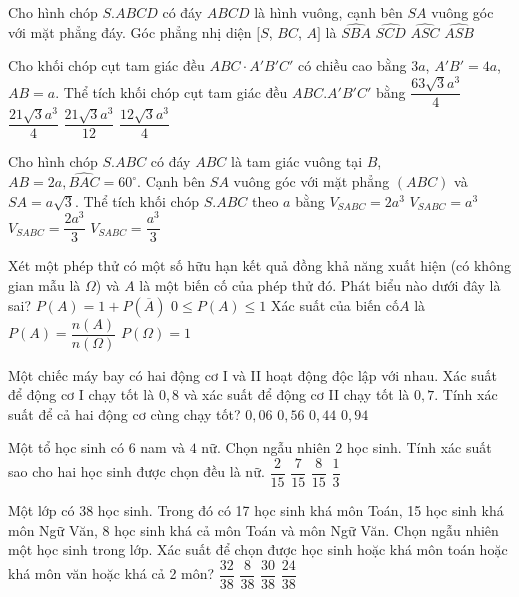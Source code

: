 \begin{ex}
Cho hình chóp $S.ABCD$ có đáy $ABCD$ là hình vuông, cạnh bên $SA$ vuông góc với mặt phẳng đáy. Góc phẳng nhị diện $[S$, $BC$, $A]$ là
\choice
{$\widehat{S B A}$}
{$\widehat{SCD}$}
{$\widehat{A S C}$}
{$\widehat{A S B}$}
\end{ex}
\begin{ex}
Cho khối chóp cụt tam giác đều $ABC \cdot A'B'C'$ có chiều cao bằng $3a$, $A'B'=4a$, $AB=a$. Thể tích khối chóp cụt tam giác đều $ABC.A'B'C'$ bằng
\choice
{$\dfrac{63\sqrt{3}a^3}{4}$}
{$\dfrac{21\sqrt{3}a^3}{4}$}
{$\dfrac{21\sqrt{3}a^3}{12}$}
{$\dfrac{12\sqrt{3}a^3}{4}$}
\end{ex}
\begin{ex}
Cho hình chóp $S.ABC$ có đáy $ABC$ là tam giác vuông tại $B$, $AB=2a,\widehat{BAC}=60^\circ $. Cạnh bên $SA$ vuông góc với mặt phẳng $(ABC)$ và $SA=a\sqrt{3}$. Thể tích khối chóp $S.ABC$ theo $a$ bằng
\choice
{${{V}_{SABC}}=2a^3$}
{${{V}_{SABC}}=a^3$}
{${{V}_{SABC}}=\dfrac{2a^3}{3}$}
{${{V}_{SABC}}=\dfrac{a^3}{3}$}
\end{ex}
\begin{ex}
Xét một phép thử có một số hữu hạn kết quả đồng khả năng xuất hiện (có không gian mẫu là $\Omega $) và $A$ là một biến cố của phép thử đó. Phát biểu nào dưới đây là sai?
\choice
{$P(A)=1+P\left(\overline{A}\right)$}
{$0\le P(A)\le 1$}
{Xác suất của biến cố$A$ là $P(A)=\dfrac{n(A)}{n\left(\Omega\right)}$}
{$P\left(\Omega\right)=1$}
\end{ex}
\begin{ex}
Một chiếc máy bay có hai động cơ I và II hoạt động độc lập với nhau. Xác suất để động cơ I chạy tốt là $0{,}8$ và xác suất để động cơ II chạy tốt là $0{,}7$. Tính xác suất để cả hai động cơ cùng chạy tốt?
\choice
{$0{,}06$}
{$0{,}56$}
{$0{,}44$}
{$0{,}94$}
\end{ex}
\begin{ex}
Một tổ học sinh có $6$ nam và $4$ nữ. Chọn ngẫu nhiên $2$ học sinh. Tính xác suất sao cho hai học sinh được chọn đều là nữ.
\choice
{$\dfrac{2}{15}$}
{$\dfrac{7}{15}$}
{$\dfrac{8}{15}$}
{$\dfrac{1}{3}$}
\end{ex}
\begin{ex}
Một lớp có 38 học sinh. Trong đó có 17 học sinh khá môn Toán, 15 học sinh khá môn Ngữ Văn, 8 học sinh khá cả môn Toán và môn Ngữ Văn. Chọn ngẫu nhiên một học sinh trong lớp. Xác suất để chọn được học sinh hoặc khá môn toán hoặc khá môn văn hoặc khá cả 2 môn?
\choice
{$\dfrac{32}{38}$}
{$\dfrac{8}{38}$}
{$\dfrac{30}{38}$}
{$\dfrac{24}{38}$}
\end{ex}
